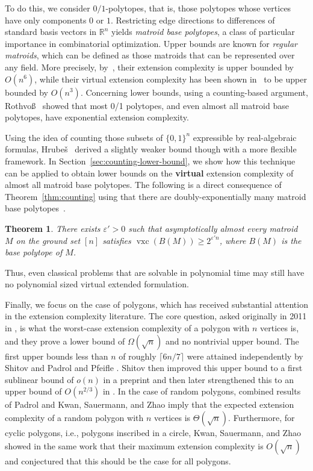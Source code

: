 \documentclass[centering,11pt,reqno]{amsart}
\newtheorem{theorem}{Theorem}[section]
\theoremstyle{definition}
\newcommand{\R}{\mathbb{R}}
\DeclareMathOperator{\vxc}{vxc}
\def\R{\mathbb{R}}
\newcommand{\defn}[1]{\emph{#1}}
\begin{document}
To do this, we consider $0/1$-polytopes, that is, those polytopes whose vertices have only components $0$ or $1$.
Restricting edge directions to differences of standard basis vectors in $\R^n$ yields \defn{matroid base polytopes}, a class of particular importance in combinatorial optimization.
Upper bounds are known for \emph{regular matroids}, which can be defined as those matroids that can be represented over any field. 
More precisely, by~\cite{AF22}, their extension complexity is upper bounded by $O(n^6)$, while their virtual extension complexity has been shown in~\cite{HKL26} to be upper bounded by $O(n^3)$. 
Concerning lower bounds, using a counting-based argument, Rothvo\ss~\cite{Rot13} showed that most 0/1 polytopes, and even almost all matroid base polytopes, have exponential extension complexity. 

Using the idea of counting those subsets of $\{0,1\}^n$ expressible by real-algebraic formulas, Hrube\v{s}~\cite{Hru20} derived a slightly weaker bound though with a more flexible framework.
In Section~\ref{sec:counting-lower-bound}, we show how this technique can be applied to 
obtain lower bounds on the \textbf{virtual} extension complexity of almost all matroid base polytopes. 
The following is a direct consequence of Theorem~\ref{thm:counting} using that there are doubly-exponentially many matroid base polytopes~\cite{Dukes2003}.

\begin{theorem} \label{thm:mbp} 
    There exists $\varepsilon'>0$ such that asymptotically almost every matroid $M$ on the ground set $[n]$ satisfies $\vxc(B(M))\ge2^{\varepsilon'n}$, where $B(M)$ is the base polytope of $M$. 
\end{theorem}

Thus, even classical problems that are solvable in polynomial time may still have no polynomial sized virtual extended formulation.





Finally, we focus on the case of polygons, which has received substantial attention in the extension complexity literature. The core question, asked originally in 2011 in \cite{PolygonExtensions}, is what the worst-case extension complexity of a polygon with $n$ vertices is, and they prove a lower bound of $\Omega(\sqrt{n})$ and no nontrivial upper bound. The first upper bounds less than $n$ of roughly $\lceil 6n/7 \rceil$ were attained independently by Shitov \cite{ShitovSubN} and Padrol and Pfeifle \cite{PadrolPfeifleSubN}. Shitov then improved this upper bound to a first sublinear bound of $o(n)$ in a preprint and then later strengthened this to an upper bound of $O(n^{2/3})$ in \cite{shitovsublinear}. In the case of random polygons, combined results of Padrol \cite{RandomPolygonLowerBounds} and Kwan, Sauermann, and Zhao  \cite{LowDimExtensions} imply that the expected extension complexity of a random polygon with $n$ vertices is $\Theta(\sqrt{n})$. Furthermore, for cyclic polygons, i.e., polygons inscribed in a circle, Kwan, Sauermann, and Zhao showed in the same work that their maximum extension complexity is $O(\sqrt{n})$ and conjectured that this should be the case for all polygons. 
\end{document}
